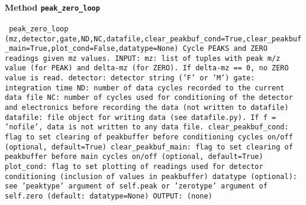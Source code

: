 \paragraph{Method \texttt{peak_zero_loop}}
\vspace{1ex}
\texttt{\newline
peak_zero_loop (mz,detector,gate,ND,NC,datafile,clear_peakbuf_cond=True,clear_peakbuf_main=True,plot_cond=False,datatype=None)\newline
\newline
Cycle PEAKS and ZERO readings given mz values.\newline
\newline
INPUT:\newline
mz: list of tuples with peak m/z value (for PEAK) and delta-mz (for ZERO). If delta-mz == 0, no ZERO value is read.\newline
detector: detector string ('F' or 'M')\newline
gate: integration time\newline
ND: number of data cycles recorded to the current data file\newline
NC: number of cycles used for conditioning of the detector and electronics before recording the data (not written to datafile)\newline
datafile: file object for writing data (see datafile.py). If f = 'nofile', data is not written to any data file.\newline
clear_peakbuf_cond: flag to set clearing of peakbuffer before conditioning cycles on/off (optional, default=True)\newline
clear_peakbuf_main: flag to set clearing of peakbuffer before main cycles on/off (optional, default=True)\newline
plot_cond: flag to set plotting of readings used for detector conditioning (inclusion of values in peakbuffer)\newline
datatype (optional): see 'peaktype' argument of self.peak or 'zerotype' argument of self.zero (default: datatype=None)\newline
OUTPUT:\newline
(none)\newline
\newline
}

